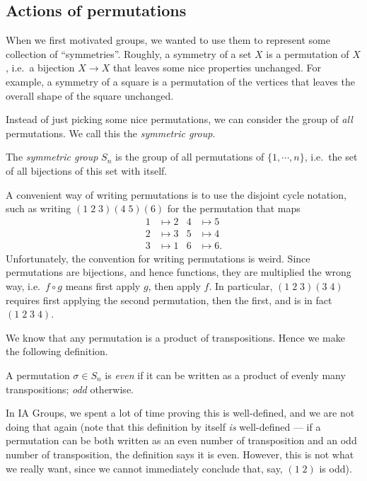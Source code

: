 \documentclass[a4paper]{article}
\begin{document}
\subsection{Actions of permutations}
When we first motivated groups, we wanted to use them to represent some collection of ``symmetries''. Roughly, a symmetry of a set $X$ is a permutation of $X$, i.e.\ a bijection $X \to X$ that leaves some nice properties unchanged. For example, a symmetry of a square is a permutation of the vertices that leaves the overall shape of the square unchanged.

Instead of just picking some nice permutations, we can consider the group of \emph{all} permutations. We call this the \emph{symmetric group}.

\begin{defi}
  The \emph{symmetric group} $S_n$ is the group of all permutations of $\{1, \cdots, n\}$, i.e.\ the set of all bijections of this set with itself.
\end{defi}

A convenient way of writing permutations is to use the disjoint cycle notation, such as writing $(1\; 2\; 3)(4\; 5)(6)$ for the permutation that maps
\begin{align*}
  1 &\mapsto 2 & 4 &\mapsto 5\\
  2 &\mapsto 3 & 5 &\mapsto 4\\
  3 &\mapsto 1 & 6 &\mapsto 6.
\end{align*}
Unfortunately, the convention for writing permutations is weird. Since permutations are bijections, and hence functions, they are multiplied the wrong way, i.e.\ $f \circ g$ means first apply $g$, then apply $f$. In particular, $(1\; 2\; 3) (3\; 4)$ requires first applying the second permutation, then the first, and is in fact $(1\; 2\; 3\; 4)$.

We know that any permutation is a product of transpositions. Hence we make the following definition.
\begin{defi}
  A permutation $\sigma \in S_n$ is \emph{even} if it can be written as a product of evenly many transpositions; \emph{odd} otherwise.
\end{defi}
In IA Groups, we spent a lot of time proving this is well-defined, and we are not doing that again (note that this definition by itself \emph{is} well-defined --- if a permutation can be both written as an even number of transposition and an odd number of transposition, the definition says it is even. However, this is not what we really want, since we cannot immediately conclude that, say, $(1\; 2)$ is odd).
\end{document}
